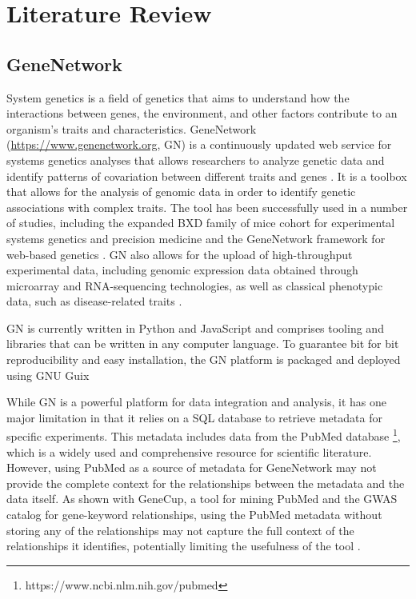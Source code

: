 \section{Literature Review}
\subsection{GeneNetwork}
System genetics is a field of genetics that aims to understand how the interactions between genes, the environment, and other factors contribute to an organism's traits and characteristics.  GeneNetwork (\url{https://www.genenetwork.org}, GN) is a continuously updated web service for systems genetics analyses that allows researchers to analyze genetic data and identify patterns of covariation between different traits and genes \citep{mulligan2017genenetwork}.  It is a toolbox that allows for the analysis of genomic data in order to identify genetic associations with complex traits. The tool has been successfully used in a number of studies, including the expanded BXD family of mice cohort for experimental systems genetics and precision medicine \citep{Ashbrook:2019} and the GeneNetwork framework for web-based genetics \citep{sloan2016genenetwork}.  GN also allows for the upload of high-throughput experimental data, including genomic expression data obtained through microarray and RNA-sequencing technologies, as well as classical phenotypic data, such as disease-related traits \citep{Anderson:2021}.

GN is currently written in Python and JavaScript and comprises tooling and libraries that can be written in any computer language.  To guarantee bit for bit reproducibility and easy installation, the GN platform is packaged and deployed using GNU Guix \citep{sloan2016genenetwork}

While GN is a powerful platform for data integration and analysis, it has one major limitation in that it relies on a SQL database to retrieve metadata for specific experiments.  This metadata includes data from the PubMed database \footnote{https://www.ncbi.nlm.nih.gov/pubmed}, which is a widely used and comprehensive resource for scientific literature.  However, using PubMed  as a source of metadata for GeneNetwork may not provide the complete context for the relationships between the metadata and the data itself.  As shown with GeneCup, a tool for mining PubMed and the GWAS catalog for gene-keyword relationships, using the PubMed metadata without storing any of the relationships may not capture the full context of the relationships it identifies, potentially limiting the usefulness of the tool \citep{gunturkun2022genecup}.


